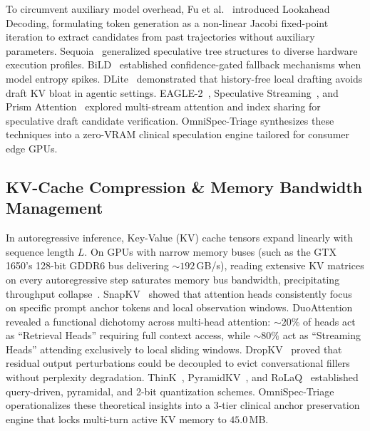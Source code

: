 \documentclass[10pt,journal,compsoc]{IEEEtran}
\begin{document}
To circumvent auxiliary model overhead, Fu et al.~\cite{fu2024lookahead} introduced Lookahead Decoding, formulating token generation as a non-linear Jacobi fixed-point iteration to extract candidates from past trajectories without auxiliary parameters. Sequoia~\cite{sequoia2024} generalized speculative tree structures to diverse hardware
execution profiles. BiLD~\cite{bild2023} established confidence-gated fallback mechanisms when model entropy spikes. DLite~\cite{dlite2026} demonstrated that history-free local drafting avoids draft KV bloat in agentic settings. EAGLE-2~\cite{eagle22024}, Speculative Streaming~\cite{applespec2024}, and Prism Attention~\cite{prism2026}
explored multi-stream attention and index sharing for speculative draft candidate verification. OmniSpec-Triage synthesizes these techniques into a zero-VRAM clinical speculation engine tailored for consumer edge GPUs.

\subsection{KV-Cache Compression \& Memory Bandwidth Management}
In autoregressive inference, Key-Value (KV) cache tensors expand linearly with sequence length $L$. On GPUs with narrow memory buses (such as the GTX 1650's 128-bit GDDR6 bus delivering $\sim 192$\,GB/s), reading extensive KV matrices on every autoregressive step saturates memory bus bandwidth, precipitating throughput
collapse~\cite{kvquant2024}. SnapKV~\cite{snapkv2024} showed that attention heads consistently focus on specific prompt anchor tokens and local observation windows. DuoAttention~\cite{duoattention2025} revealed a functional dichotomy across multi-head attention: $\sim 20\%$ of heads act as ``Retrieval Heads'' requiring full context
access, while $\sim 80\%$ act as ``Streaming Heads'' attending exclusively to local sliding windows. DropKV~\cite{dropkv2026} proved that residual output perturbations could be decoupled to evict conversational fillers without perplexity degradation. ThinK~\cite{think2025}, PyramidKV~\cite{pyramidkv2025}, and RoLaQ~\cite{rolaq2026}
established query-driven, pyramidal, and 2-bit quantization schemes. OmniSpec-Triage operationalizes these theoretical insights into a 3-tier clinical anchor preservation engine that locks multi-turn active KV memory to $45.0$\,MB.
\end{document}
